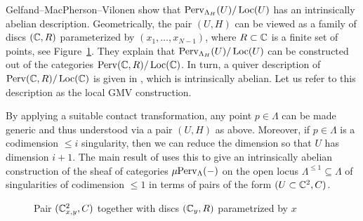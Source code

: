 Gelfand--MacPherson--Vilonen \cite{gelfandMicrolocalPerverseSheaves2005} show that $\operatorname{Perv}_{\Lambda_H}(U)/\operatorname{Loc}(U)$ has an intrinsically abelian description. Geometrically, the pair $(U,H)$ can be viewed as a family of discs $(\mathbb{C},R)$ parameterized by $(x_1,\dots,x_{N-1})$, where $R\subset \mathbb{C}$ is a finite set of points, see Figure~\ref{figure:y2x4}. They explain that $\operatorname{Perv}_{\Lambda_H}(U)/\operatorname{Loc}(U)$ can be constructed out of the categories $\operatorname{Perv}(\mathbb{C},R)/\operatorname{Loc}(\mathbb{C})$. In turn, a quiver description of $\operatorname{Perv}(\mathbb{C},R)/\operatorname{Loc}(\mathbb{C})$ is given in \cite{gelfandPerverseSheavesQuivers1996}, which is intrinsically abelian. Let us refer to this description as the local GMV construction.

\begin{rmk}\label{rmk:gmvfull}
    By applying a suitable contact transformation, any point $p\in\Lambda$ can be made generic and thus understood via a pair $(U,H)$ as above. Moreover, if $p\in\Lambda$ is a codimension $\leq i$ singularity, then we can reduce the dimension so that $U$ has dimension $i+1$. The main result of \cite{gelfandMicrolocalPerverseSheaves2005} uses this to give an intrinsically abelian construction of the sheaf of categories $\mu\kern -2pt \operatorname{Perv}_{\Lambda}(-)$ on the open locus $\Lambda^{\leq 1}\subseteq \Lambda$ of singularities of codimension $\leq1$ in terms of pairs of the form $(U\subset \mathbb{C}^2,C)$.
\end{rmk}

\begin{figure}
    \caption{Pair $(\mathbb{C}^2_{x,y},C)$ together with discs $(\mathbb{C}_y,R)$ parametrized by $x$}
    \label{figure:y2x4}
\end{figure}

